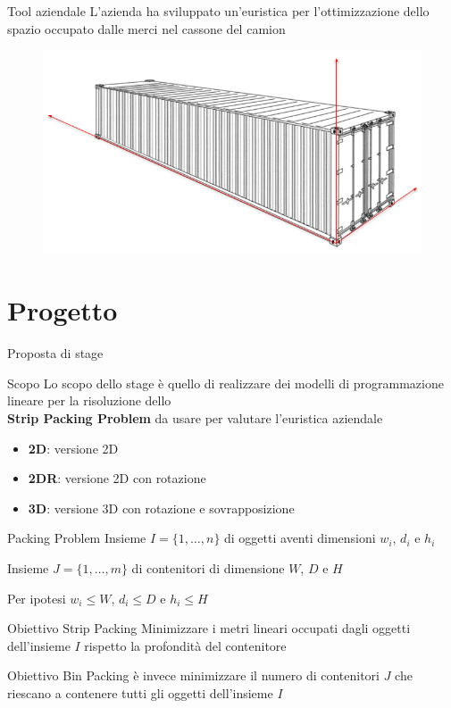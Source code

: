 \documentclass{beamer}
\begin{document}
\begin{frame}{Tool aziendale}
	L'azienda ha sviluppato un'euristica per l'ottimizzazione dello spazio occupato dalle merci nel cassone del camion
	\begin{figure}[H]
		\begin{center} \includegraphics[width=1\linewidth]{figures/container_arrows}
		\end{center}
	\end{figure}
\end{frame}

\section{Progetto}
\begin{frame}{Proposta di stage}
	\begin{alertblock}{Scopo}
		Lo scopo dello stage \`e  quello di realizzare dei modelli di programmazione lineare per la risoluzione dello \\ \textbf{Strip Packing Problem} da usare per valutare l'euristica aziendale
	\end{alertblock}
	\begin{itemize}
		\item \textbf{2D}: versione 2D
		\item \textbf{2DR}: versione 2D con rotazione
		\item \textbf{3D}: versione 3D con rotazione e sovrapposizione
	\end{itemize}
\end{frame}

\begin{frame}{Packing Problem}
	Insieme $I = \{1,\dots,n\}$ di oggetti aventi dimensioni $w_{i}$, $d_{i}$ e $h_{i}$	
																		
	Insieme $J = \{1,\dots,m\}$ di contenitori di dimensione $W$, $D$ e $H$
																
	Per ipotesi $w_{i} \leq W$, $d_{i} \leq D$ e $h_{i} \leq H$
	\vspace{.5em}
	\begin{alertblock}{Obiettivo Strip Packing}
		Minimizzare i metri lineari occupati dagli oggetti dell'insieme $I$ rispetto la profondit\`a del contenitore
	\end{alertblock}	
	Obiettivo Bin Packing \`e invece minimizzare il numero di contenitori $J$ che riescano a contenere tutti gli oggetti dell'insieme $I$
\end{frame}
\end{document}
